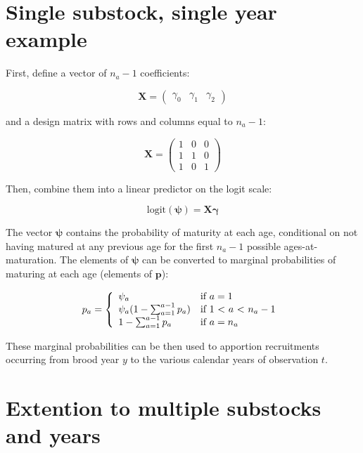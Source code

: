 \documentclass[12pt,]{book}
\theoremstyle{definition}
\theoremstyle{definition}
\theoremstyle{definition}
\theoremstyle{remark}
\begin{document}
\section{Single substock, single year
example}\label{single-substock-single-year-example}

\noindent
First, define a vector of \(n_a - 1\) coefficients:

\[
   \mathbf{X}=
  \left( {\begin{array}{ccc}
   \gamma_{0} & \gamma_1 & \gamma_2
  \end{array} } \right)
\]

\noindent
and a design matrix with rows and columns equal to \(n_a - 1\):

\[
   \mathbf{X}=
  \left( {\begin{array}{ccc}
   1 & 0 & 0\\
   1 & 1 & 0\\
   1 & 0 & 1
  \end{array} } \right)
\]

\noindent
Then, combine them into a linear predictor on the logit scale:

\[\text{logit}(\boldsymbol{\psi}) = \mathbf{X}\boldsymbol{\gamma}\]

\noindent
The vector \(\boldsymbol{\psi}\) contains the probability of maturity at
each age, conditional on not having matured at any previous age for the
first \(n_a - 1\) possible ages-at-maturation. The elements of
\(\boldsymbol{\psi}\) can be converted to marginal probabilities of
maturing at each age (elements of \(\boldsymbol{p}\)):

\[
  p_a = \left\{ \begin{array}{ll}
  \psi_a & \mbox{if $a = 1$} \\
  \psi_a(1 - \sum_{a=1}^{a-1} p_a) & \mbox{if 1 < $a$ < $n_a - 1$} \\
  1 - \sum_{a=1}^{a-1} p_a & \mbox{if $a = n_a$ } \\
  \end{array}
  \right. \\
\]

\noindent
These marginal probabilities can be then used to apportion recruitments
occurring from brood year \(y\) to the various calendar years of
observation \(t\).

\section{Extention to multiple substocks and
years}\label{extention-to-multiple-substocks-and-years}
\end{document}
